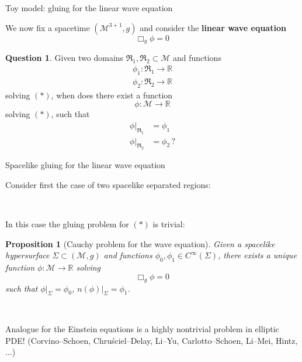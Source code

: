 \documentclass[compress,usenames,dvipsnames,8pt]{beamer}
\newtheorem*{prop}{Proposition}
\theoremstyle{definition}
\newtheorem*{q}{Question}
\renewcommand{\(}{\begin{columns}}
\renewcommand{\)}{\end{columns}}
\newcommand{\<}[1]{\begin{column}{#1}}
\renewcommand{\>}{\end{column}}
\begin{document}
\begin{frame}{Toy model: gluing for the linear wave equation}

We now fix a spacetime $(\mathcal M^{3+1},g)$ and consider the \textbf{linear wave equation}
\begin{equation}
\Box_g \phi=0\tag{$*$}
\end{equation}

\pause

\begin{q}
Given two domains $\mathfrak R_1,\mathfrak R_2\subset \mathcal M$ and functions 
\begin{align*}
\phi_1:\mathfrak R_1\to \mathbb R\\
\phi_2:\mathfrak R_2\to \mathbb R
\end{align*}
solving $(*)$\pause, when does there exist a function 
\[\phi:\mathcal M\to \mathbb R\] solving $(*)$, such that 
\begin{align*}
\phi|_{\mathfrak R_1}&= \phi_1\\
\phi|_{\mathfrak R_2} &= \phi_2\,?
\end{align*}
\end{q}

\end{frame}

\begin{frame}{Spacelike gluing for the linear wave equation}

Consider first the case of two spacelike separated regions:

\begin{figure}
 \def\svgwidth{20pc}

\end{figure}

~\\

\pause

In this case the gluing problem for $(*)$ is trivial:

\begin{prop}[Cauchy problem for the wave equation]
Given a spacelike hypersurface $\Sigma\subset (\mathcal M,g)$ and functions $\phi_0,\phi_1\in C^\infty(\Sigma)$, there exists a unique function $\phi:\mathcal M\to \mathbb R$ solving 
\[\Box_g\phi =0 \tag{$*$}\]
such that $\phi|_\Sigma=\phi_0$, $n(\phi)|_\Sigma = \phi_1$.
\end{prop}

~\\

\pause

Analogue for the Einstein equations is a highly nontrivial problem in elliptic PDE! (\footnotesize{Corvino--Schoen, Chru\'{s}ciel--Delay, Li--Yu, Carlotto--Schoen, Li--Mei, Hintz, ...})

\end{frame}
\end{document}
